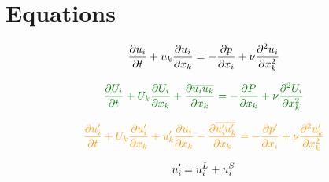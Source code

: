 \section{\label{sec:Equations} Equations }

\begin{equation}
    \textcolor{black}{\pdv{u_i}{t} + u_k\pdv{u_i}{x_k} = - \pdv{p}{x_i} + \nu \pdv[2]{u_i}{x_k}}
\end{equation}

\begin{equation}
    \textcolor{mygreen2}{\pdv{U_i}{t} + U_k\pdv{U_i}{x_k} + \pdv{\overline{u_i u_k}}{x_k} = - \pdv{P}{x_k} + \nu \pdv[2]{U_i}{x_k}}
\end{equation}

\begin{equation}
    \textcolor{myorange1}{\pdv{u_i\myprime}{t} + 
    U_k\pdv{u_i\myprime}{x_k} + u_k\myprime\pdv{u_i}{x_k} - \pdv{\overline{u_i\myprime u_k\myprime}}{x_k}  =
    - \pdv{p\myprime}{x_i} + \nu \pdv[2]{u_k\myprime}{x_k}}
\end{equation}

\begin{equation}
    u_i^{\prime}\mkern-1.2mu = u_i^L + u_i^S
\end{equation}